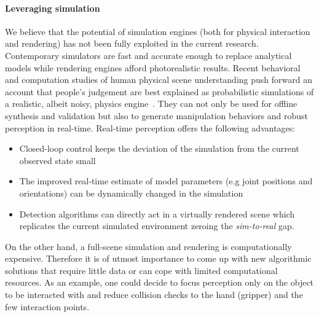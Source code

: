 \paragraph{Leveraging simulation} We believe that the potential of simulation engines (both for physical interaction and rendering) has not been fully exploited in the current research. Contemporary simulators are fast and accurate enough to replace analytical models while rendering engines afford photorealistic results. Recent behavioral and computation studies of human physical scene understanding push forward an account that people's judgement are best explained as probabilistic simulations of a realistic, albeit noisy, physics engine~\cite{wu2015galileo}.
They can not only be used for offline synthesis and validation but also to generate manipulation behaviors and robust perception in real-time. Real-time perception offers the following advantages:
\begin{itemize}
\item Closed-loop control keeps the deviation of the simulation from the current observed state small
\item The improved real-time estimate of model parameters (e.g joint positions and orientations) can be dynamically changed in the simulation
\item Detection algorithms can directly act in a virtually rendered scene which replicates the current simulated environment zeroing the \emph{sim-to-real} gap.
\end{itemize}
On the other hand, a full-scene simulation and rendering is computationally expensive. Therefore it is of utmost importance to come up with new algorithmic solutions that require little data or can cope with limited computational resources. As an example, one could decide to focus perception only on the object to be interacted with and reduce collision checks to the hand (gripper) and the few interaction points.  



